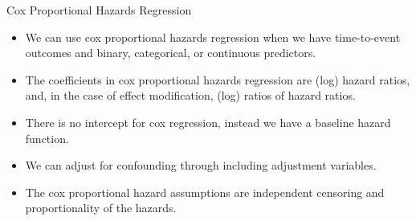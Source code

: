 \documentclass[10pt,t]{beamer}
\begin{document}
\begin{frame}{Cox Proportional Hazards Regression}
	\begin{itemize}
		\item We can use cox proportional hazards regression when we have time-to-event outcomes and binary, categorical, or continuous predictors.
		
		\medskip
		
		\item The coefficients in cox proportional hazards regression are (log) hazard ratios, and, in the case of effect modification, (log) ratios of hazard ratios.
		
		\medskip
		
		\item There is no intercept for cox regression, instead we have a baseline hazard function.
		
		\medskip
		
		\item We can adjust for confounding through including adjustment variables.
		
		\medskip
		
		\item The cox proportional hazard assumptions are independent censoring and proportionality of the hazards.
	
	\end{itemize}
\end{frame}
\end{document}
